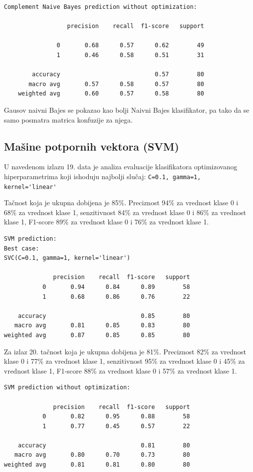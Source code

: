 \documentclass[fontsize=12bp, paper=a4]{scrarticle}
\begin{document}
\begin{lstlisting}[caption=Komplementarni naivni Bajes bez optimizacije hiperparametara]
Complement Naive Bayes prediction without optimization:
    
                  precision    recall  f1-score   support
    
               0       0.68      0.57      0.62        49
               1       0.46      0.58      0.51        31
    
        accuracy                           0.57        80
       macro avg       0.57      0.58      0.57        80
    weighted avg       0.60      0.57      0.58        80
\end{lstlisting}

Gausov naivni Bajes se pokazao kao bolji Naivni Bajes klasifikator, pa tako da se samo posmatra matrica konfuzije za njega.

\subsection{Mašine potpornih vektora (SVM)}
U navedenom izlazu 19. data je analiza evaluacije klasifikatora 
 optimizovanog hiperparametrima koji ishoduju najbolji slučaj: \verb|C=0.1, gamma=1, kernel='linear'|

Tačnost koja je ukupna dobijena je 85\%. Preciznost 94\% za vrednost klase 0 i 68\% za vrednost klase 1, senzitivnost 84\% za vrednost klase 0 i 86\% za vrednost klase 1, F1-score 89\% za vrednost klase 0 i 76\% za vrednost klase 1.

\begin{lstlisting}[caption=SVM sa optimizacijom hiperparametara]
SVM prediction:
Best case:
SVC(C=0.1, gamma=1, kernel='linear')

              precision    recall  f1-score   support
           0       0.94      0.84      0.89        58
           1       0.68      0.86      0.76        22

    accuracy                           0.85        80
   macro avg       0.81      0.85      0.83        80
weighted avg       0.87      0.85      0.85        80
\end{lstlisting}

Za izlaz 20. tačnost koja je ukupna dobijena je 81\%. Preciznost 82\% za vrednost klase 0 i 77\% za vrednost klase 1, senzitivnost 95\% za vrednost klase 0 i 45\% za vrednost klase 1, F1-score 88\% za vrednost klase 0 i 57\% za vrednost klase 1.


\begin{lstlisting}[caption=SVM bez optimizacije hiperparametara]
SVM prediction without optimization:

              precision    recall  f1-score   support
           0       0.82      0.95      0.88        58
           1       0.77      0.45      0.57        22

    accuracy                           0.81        80
   macro avg       0.80      0.70      0.73        80
weighted avg       0.81      0.81      0.80        80
\end{lstlisting}
\end{document}
